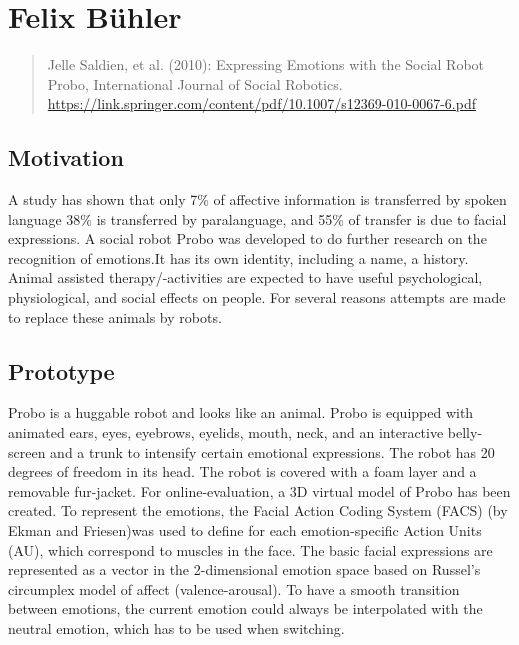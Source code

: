 \documentclass[smallheadings,english, DIV14]{scrartcl}
\begin{document}
\thispagestyle{empty}

\section*{Felix Bühler}
%
\begin{quote}
	Jelle Saldien, et al. (2010): Expressing Emotions with the Social Robot Probo, International Journal of Social Robotics. \url{https://link.springer.com/content/pdf/10.1007/s12369-010-0067-6.pdf}
\end{quote}

\subsection*{Motivation}

A study has shown that only 7\% of affective information is transferred
by spoken language 38\% is transferred by paralanguage, and 55\% of transfer is due to facial expressions. A social robot Probo was developed to do further research on the recognition of emotions.It has its own identity, including a name, a history. 
Animal assisted therapy/-activities are expected to have useful psychological, physiological, and social effects on people. For several reasons attempts are made to replace these animals by robots.

\subsection*{Prototype}

Probo is a huggable robot and looks like an animal. Probo is equipped with animated ears, eyes, eyebrows, eyelids, mouth, neck, and an interactive belly-screen and a trunk to intensify certain emotional expressions. The robot has 20 degrees of freedom in its head. The robot is covered with a foam layer and a removable fur-jacket. For online-evaluation, a 3D virtual model of Probo has been created.
To represent the emotions, the Facial Action Coding System (FACS) (by Ekman and Friesen)was used to define for each emotion-specific Action Units (AU), which correspond to muscles in the face.
The basic facial expressions are represented as a vector in the 2-dimensional emotion space based on Russel’s circumplex model of affect (valence-arousal). To have a smooth transition between emotions, the current emotion could always be interpolated with the neutral emotion, which has to be used when switching.
\end{document}
